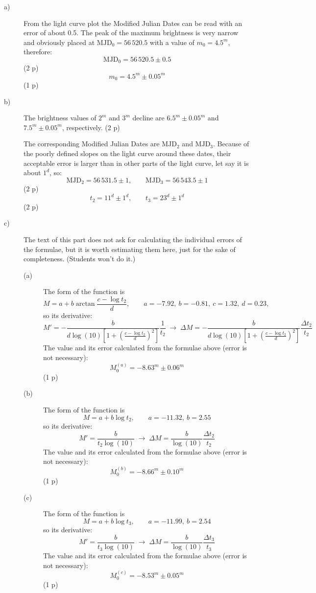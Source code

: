 \begin{description}
\item[a)] From the light curve plot the Modified Julian Dates can be read
  with an error of about 0.5. The peak of the maximum brightness is very
  narrow and obviously placed at $\mathrm{MJD}_0 = 56\,520.5$ with a value of
  $m_0 = 4.5^m$, therefore:
  \[ \mathrm{MJD}_0 = 56\,520.5 \pm 0.5 \]
  \hfill(2 p)
  \[ m_0 = 4.5^m \pm 0.05^m \]
  \hfill(1 p)

\item[b)] The brightness values of $2^m$ and $3^m$ decline are
  $6.5^m \pm 0.05^m$ and $7.5^m \pm 0.05^m$, respectively. \hfill(2 p)

  The corresponding Modified Julian Dates are $\mathrm{MJD}_2$ and
  $\mathrm{MJD}_3$. Because of the poorly defined slopes on the light curve
  around these dates, their acceptable error is larger than in other parts of
  the light curve, let say it is about $1^d$, so:
  \[ \mathrm{MJD}_2 = 56\,531.5 \pm 1, \qquad
     \mathrm{MJD}_3 = 56\,543.5 \pm 1 \]
  \hfill(2 p)
  \[ t_2 = 11^d \pm 1^d, \qquad t_3 = 23^d \pm 1^d \]
  \hfill(2 p)

\item[c)] The text of this part does not ask for calculating the individual
  errors of the formulae, but it is worth estimating them here, just for the
  sake of completeness. (Students won't do it.)
  \begin{description}
  \item[(a)] The form of the function is
    \[ M = a + b \arctan\frac{c - \log t_2}{d}, \qquad
       a = -7.92,\ b = -0.81,\ c = 1.32,\ d = 0.23,
       \tag*{(1.1)} \]
    so its derivative:
    \[ M' = -\frac{b}{d \log(10)
       \left[ 1 + \left( \frac{c - \log t_2}{d} \right)^2 \right]}
       \frac{1}{t_2}
       \;\rightarrow\;
       \Delta M = -\frac{b}{d \log(10)
       \left[ 1 + \left( \frac{c - \log t_2}{d} \right)^2 \right]}
       \frac{\Delta t_2}{t_2}
       \tag*{(1.2)} \]
    The value and its error calculated from the formulae above (error is not
    necessary):
    \[ M_0^{(a)} = -8.63^m \pm 0.06^m \]
    \hfill(1 p)
  \item[(b)] The form of the function is
    \[ M = a + b \log t_2, \qquad a = -11.32,\ b = 2.55
       \tag*{(1.3)} \]
    so its derivative:
    \[ M' = \frac{b}{t_2 \log(10)}
       \;\rightarrow\;
       \Delta M = \frac{b}{\log(10)} \frac{\Delta t_2}{t_2}
       \tag*{(1.4)} \]
    The value and its error calculated from the formulae above (error is not
    necessary):
    \[ M_0^{(b)} = -8.66^m \pm 0.10^m \]
    \hfill(1 p)
  \item[(c)] The form of the function is
    \[ M = a + b \log t_3, \qquad a = -11.99,\ b = 2.54
       \tag*{(1.5)} \]
    so its derivative:
    \[ M' = \frac{b}{t_3 \log(10)}
       \;\rightarrow\;
       \Delta M = \frac{b}{\log(10)} \frac{\Delta t_3}{t_3}
       \tag*{(1.6)} \]
    The value and its error calculated from the formulae above (error is not
    necessary):
    \[ M_0^{(c)} = -8.53^m \pm 0.05^m \]
    \hfill(1 p)
  \end{description}


\end{description}
